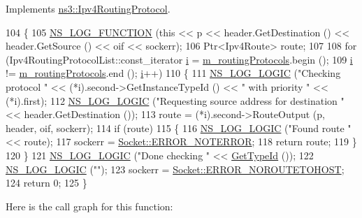 Implements \hyperlink{classns3_1_1Ipv4RoutingProtocol_a9c0e9b77772a4974c06ee4577fe60547}{ns3\+::\+Ipv4\+Routing\+Protocol}.


\begin{DoxyCode}
104 \{
105   \hyperlink{log-macros-disabled_8h_a90b90d5bad1f39cb1b64923ea94c0761}{NS\_LOG\_FUNCTION} (\textcolor{keyword}{this} << p << header.GetDestination () << header.GetSource () << oif << 
      sockerr);
106   Ptr<Ipv4Route> route;
107 
108   \textcolor{keywordflow}{for} (Ipv4RoutingProtocolList::const\_iterator \hyperlink{bernuolliDistribution_8m_a6f6ccfcf58b31cb6412107d9d5281426}{i} = \hyperlink{classns3_1_1Ipv4ListRouting_a49de17cac4bf72e28b064bff3a93d29d}{m\_routingProtocols}.begin ();
109        \hyperlink{bernuolliDistribution_8m_a6f6ccfcf58b31cb6412107d9d5281426}{i} != \hyperlink{classns3_1_1Ipv4ListRouting_a49de17cac4bf72e28b064bff3a93d29d}{m\_routingProtocols}.end (); \hyperlink{bernuolliDistribution_8m_a6f6ccfcf58b31cb6412107d9d5281426}{i}++)
110     \{
111       \hyperlink{group__logging_ga88acd260151caf2db9c0fc84997f45ce}{NS\_LOG\_LOGIC} (\textcolor{stringliteral}{"Checking protocol "} << (*i).second->GetInstanceTypeId () << \textcolor{stringliteral}{" with
       priority "} << (*i).first);
112       \hyperlink{group__logging_ga88acd260151caf2db9c0fc84997f45ce}{NS\_LOG\_LOGIC} (\textcolor{stringliteral}{"Requesting source address for destination "} << header.GetDestination ());
113       route = (*i).second->RouteOutput (p, header, oif, sockerr);
114       \textcolor{keywordflow}{if} (route)
115         \{
116           \hyperlink{group__logging_ga88acd260151caf2db9c0fc84997f45ce}{NS\_LOG\_LOGIC} (\textcolor{stringliteral}{"Found route "} << route);
117           sockerr = \hyperlink{classns3_1_1Socket_ada1328c5ae0c28cb2a982caf8f6d6ccaaa7eb006d73c5ad0117c5591fcb3469f7}{Socket::ERROR\_NOTERROR};
118           \textcolor{keywordflow}{return} route;
119         \}
120     \}
121   \hyperlink{group__logging_ga88acd260151caf2db9c0fc84997f45ce}{NS\_LOG\_LOGIC} (\textcolor{stringliteral}{"Done checking "} << \hyperlink{classns3_1_1Ipv4ListRouting_ab144e93a79312b4122207a6b623012f1}{GetTypeId} ());
122   \hyperlink{group__logging_ga88acd260151caf2db9c0fc84997f45ce}{NS\_LOG\_LOGIC} (\textcolor{stringliteral}{""});
123   sockerr = \hyperlink{classns3_1_1Socket_ada1328c5ae0c28cb2a982caf8f6d6ccaa0f8ecb5a4ddbce3bade35fa12c3d49e8}{Socket::ERROR\_NOROUTETOHOST};
124   \textcolor{keywordflow}{return} 0;
125 \}
\end{DoxyCode}


Here is the call graph for this function\+:


